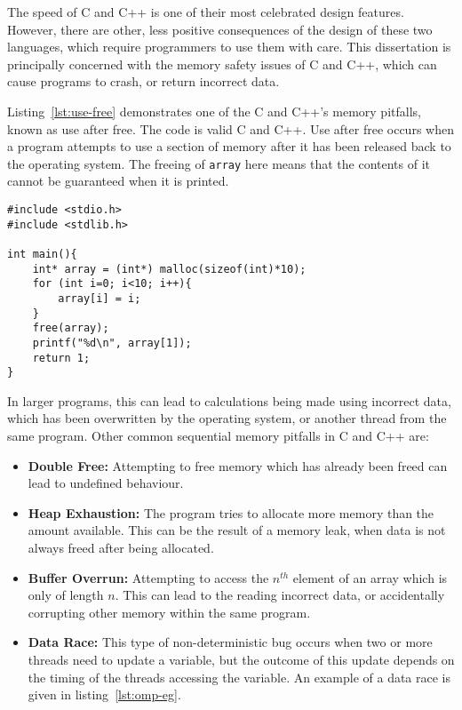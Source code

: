 The speed of C and C++ is one of their most celebrated design features. However, there are other, less positive consequences of the design of these two languages, which require programmers to use them with care. This dissertation is principally concerned with the memory safety issues of C and C++, which can cause programs to crash, or return incorrect data.

Listing~\ref{lst:use-free} demonstrates one of the C and C++'s memory pitfalls, known as use after free. The code is valid C and C++. Use after free occurs when a program attempts to use a section of memory after it has been released back to the operating system.
The freeing of \texttt{array} here means that the contents of it cannot be guaranteed when it is printed.

\begin{code}
\begin{verbatim}
#include <stdio.h>
#include <stdlib.h>

int main(){
    int* array = (int*) malloc(sizeof(int)*10);
    for (int i=0; i<10; i++){
        array[i] = i;
    }
    free(array);
    printf("%d\n", array[1]);
    return 1;
}
\end{verbatim}
\label{lst:use-free}
\end{code}

In larger programs, this can lead to calculations being made using incorrect data, which has been overwritten by the operating system, or another thread from the same program. Other common sequential memory pitfalls in C and C++ are:

\begin{itemize}
    \item \textbf{Double Free:} Attempting to free memory which has already been freed can lead to undefined behaviour.
    \item \textbf{Heap Exhaustion:} The program tries to allocate more memory than the amount available. This can be the result of a memory leak, when data is not always freed after being allocated.
    \item \textbf{Buffer Overrun:} Attempting to access the $n^{th}$ element of an array which is only of length $n$. This can lead to the reading incorrect data, or accidentally corrupting other memory within the same program.
    \item \textbf{Data Race:} This type of non-deterministic bug occurs when two or more threads need to update a variable, but the outcome of this update depends on the timing of the threads accessing the variable. An example of a data race is given in listing~\ref{lst:omp-eg}.
\end{itemize}

